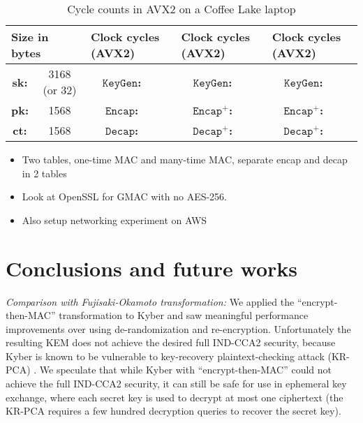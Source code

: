 \documentclass[floatrow,journal=tches,submission]{iacrtrans}
\newcommand{\keygen}{\texttt{KeyGen}}
\newcommand{\encap}{\texttt{Encap}}
\newcommand{\decap}{\texttt{Decap}}
\begin{document}
\begin{table}[h]
\begin{tabular}{|c|c||c|c| |c|c| |c|c|}
\multicolumn{2}{|l|}{Size in bytes} & \multicolumn{2}{|l|}{Clock cycles (AVX2)} & \multicolumn{2}{|l|}{Clock cycles (AVX2)} & \multicolumn{2}{|l|}{Clock cycles (AVX2)} \\ \hline 
{\bf sk:} & 3168 (or 32) & {\bf $\keygen$:} & & {\bf $\keygen$:} & & {\bf $\keygen$:} & \\ \hline 
{\bf pk:} & 1568 & {\bf $\encap$:} & & {\bf $\encap^+$:} & & {\bf $\encap^+$:} & \\ \hline 
{\bf ct:} & 1568 & {\bf $\decap$:} & & {\bf $\decap^+$:} & & {\bf $\decap^+$:} & \\ \hline 
\end{tabular}
\caption{Cycle counts in AVX2 on a Coffee Lake laptop}
\label{tab:ExpResults}
\end{table}

\begin{itemize}
\item Two tables, one-time MAC and many-time MAC, separate encap and decap in 2 tables
\item Look at OpenSSL for GMAC with no AES-256. 
\item Also setup networking experiment on AWS
\end{itemize}

\section{Conclusions and future works}\label{sec:future-works}
\emph{Comparison with Fujisaki-Okamoto transformation:} We applied the ``encrypt-then-MAC'' transformation to Kyber and saw meaningful performance improvements over using de-randomization and re-encryption. Unfortunately the resulting KEM does not achieve the desired full IND-CCA2 security, because Kyber is known to be vulnerable to key-recovery plaintext-checking attack (KR-PCA) \cite{ravi2019generic}\cite{ueno2022curse}. We speculate that while Kyber with ``encrypt-then-MAC'' could not achieve the full IND-CCA2 security, it can still be safe for use in ephemeral key exchange, where each secret key is used to decrypt at most one ciphertext (the KR-PCA requires a few hundred decryption queries to recover the secret key).
\end{document}
